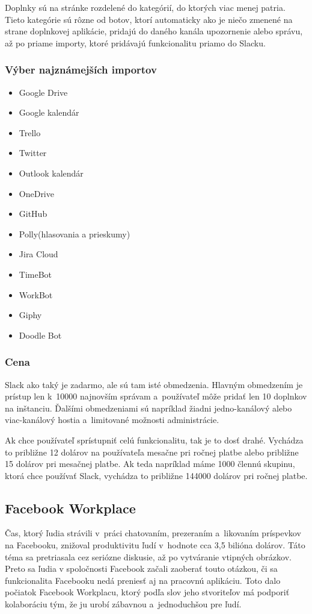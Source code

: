 \indent Doplnky sú na stránke rozdelené do kategórií, do ktorých viac menej patria. Tieto kategórie sú rôzne od botov, ktorí automaticky ako je niečo zmenené na strane doplnkovej aplikácie, pridajú do daného kanála upozornenie alebo správu, až po priame importy, ktoré pridávajú funkcionalitu priamo do Slacku.
\subsubsection{Výber najznámejších importov}
\begin{itemize}
    \item Google Drive
    \item Google kalendár
    \item Trello
    \item Twitter
    \item Outlook kalendár
    \item OneDrive
    \item GitHub
    \item Polly(hlasovania a prieskumy)
    \item Jira Cloud
    \item TimeBot
    \item WorkBot
    \item Giphy
    \item Doodle Bot
\end{itemize}
\subsubsection{Cena}
\indent Slack ako taký je zadarmo, ale sú tam isté obmedzenia. Hlavným obmedzením je prístup len k 10000 najnovším správam a používateľ môže pridať len 10 doplnkov na inštanciu. Ďalšími obmedzeniami sú napríklad žiadni jedno-kanálový alebo viac-kanálový hostia a limitované možnosti administrácie. 

\indent Ak chce používateľ sprístupniť celú funkcionalitu, tak je to dosť drahé. Vychádza to približne 12 dolárov na používateľa mesačne pri ročnej platbe alebo približne 15 dolárov pri mesačnej platbe. Ak teda napríklad máme 1000 člennú skupinu, ktorá chce používať Slack, vychádza to približne 144000 dolárov pri ročnej platbe.

\subsection{Facebook Workplace}
\indent Čas, ktorý ľudia strávili v práci chatovaním, prezeraním a likovaním príspevkov na Facebooku, znižoval produktivitu ľudí v hodnote cca 3,5 bilióna dolárov. Táto téma sa pretriasala cez seriózne diskusie, až po vytváranie vtipných obrázkov. Preto sa ľudia v spoločnosti Facebook začali zaoberať touto otázkou, či sa funkcionalita Facebooku nedá preniesť aj na pracovnú aplikáciu. Toto dalo počiatok Facebook Workplacu, ktorý podľa slov jeho stvoriteľov má podporiť kolaboráciu tým, že ju urobí zábavnou a jednoduchšou pre ľudí.

